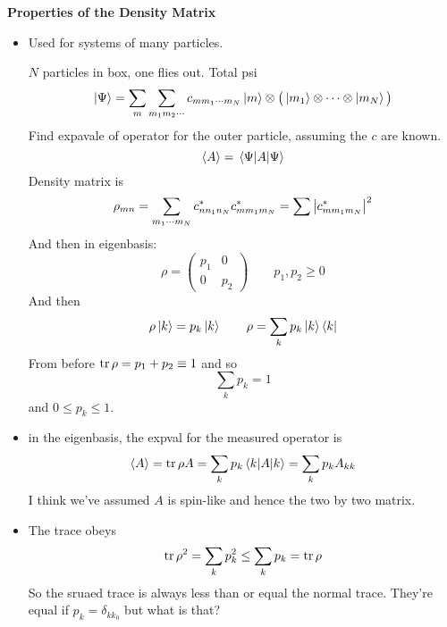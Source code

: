 \documentclass[11pt, a4paper]{article}
\begin{document}
\textbf{Properties of the Density Matrix}
\begin{itemize}
    \item Used for systems of many particles. 

    $ N $ particles in box, one flies out. Total psi
    \begin{equation*}
        \ket{\Psi} = \sum_{m} \sum_{m_{1}m_{2}\cdots} c_{m m_{1}\cdots m_{N}} \ket{m} \otimes \big( \ket{m_{1}}\otimes \cdots \otimes \ket{m_{N}} \big)
    \end{equation*}
    Find expavale of operator for the outer particle, assuming the $ c $ are known. 
    \begin{equation*}
        \ev{A} = \mel{\Psi}{A}{\Psi}
    \end{equation*}
    Density matrix is
    \begin{equation*}
        \rho_{mn} = \sum_{m_{1} \cdots m_{N}} c_{n n_{1}n_{N}}^{*} c_{m m_{1}m_{N}}^{*}= \sum \abs{c_{m m_{1}m_{N}}^{*} }^{2}
    \end{equation*}
    And then in eigenbasis:
    \begin{equation*}
        \rho = 
        \begin{pmatrix}
            p_{1} & 0\\
            0 & p_{2}
        \end{pmatrix}
        \qquad p_{1}, p_{2} \geq 0
    \end{equation*}
    And then
    \begin{equation*}
        \rho \ket{k} = p_{k}\ket{k} \qquad \rho = \sum_{k} p_{k} \ket{k}\bra{k}
    \end{equation*}
    From before $ \tr \rho = p_{1} + p_{2} \equiv 1 $ and so 
    \begin{equation*}
        \sum_{k} p_{k} = 1
    \end{equation*}
    and $ 0 \leq p_{k} \leq 1 $. 

    \item in the eigenbasis, the expval for the measured operator is
    \begin{equation*}
        \ev{A} = \tr \rho A = \sum_{k} p_{k} \mel{k}{A}{k} = \sum_{k}p_{k}A_{kk}
    \end{equation*}
    I think we've assumed $ A $ is spin-like and hence the two by two matrix. 

    \item The trace obeys
    \begin{equation*}
        \tr \rho^{2} = \sum_{k} p_{k}^{2} \leq \sum_{k} p_{k} = \tr \rho
    \end{equation*}
    So the sruaed trace is always less than or equal the normal trace. They're equal if $ p_{k} = \delta_{kk_{0}} $ but what is that?
    


\end{itemize}
\end{document}
